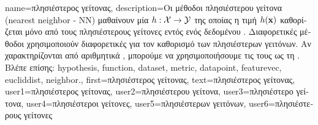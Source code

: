 {name={\foreignlanguage{greek}{πλησιέστερος γείτονας}},
	description={\foreignlanguage{greek}{Οι μέθοδοι πλησιέστερου γείτονα} 
		(nearest neighbor - NN) \foreignlanguage{greek}{μαθαίνουν μία}  
		$h: \mathcal{X} \rightarrow \mathcal{Y}$ \foreignlanguage{greek}{της οποίας η τιμή}  
		$h({\bf x})$ \foreignlanguage{greek}{καθορίζεται μόνο από τους πλησιέστερους γείτονες εντός ενός 
		δεδομένου} . \foreignlanguage{greek}{Διαφορετικές μέθοδοι χρησιμοποι\-ούν διαφορετικές}
		 \foreignlanguage{greek}{για τον καθορισμό των πλησιέστερων γειτόνων. Αν}   
		\foreignlanguage{greek}{χαρακτηρίζονται από αριθμητικά} , \foreignlanguage{greek}{μπορούμε 
		να χρησιμοποιήσουμε τις}  \foreignlanguage{greek}{τους ως τη} .
		\\
		\foreignlanguage{greek}{Βλέπε επίσης:} \gls{hypothesis}, \gls{function}, \gls{dataset}, \gls{metric}, \gls{datapoint}, \gls{featurevec}, 
		\gls{eucliddist}, \gls{neighbor}.},
	first={\foreignlanguage{greek}{πλησιέστερος γείτονας}},
	text={\foreignlanguage{greek}{πλησιέστερος γείτονας}},
	user1={\foreignlanguage{greek}{πλησιέστερος γείτονας}}, %
   	user2={\foreignlanguage{greek}{πλησιέστερου γείτονα}}, %
	user3={\foreignlanguage{greek}{πλησιέστερο γείτονα}}, %
   	user4={\foreignlanguage{greek}{πλησιέστεροι γείτονες}}, %
	user5={\foreignlanguage{greek}{πλησιέστερων γειτόνων}}, %
   	user6={\foreignlanguage{greek}{πλησιέστερους γείτονες}} %
}

